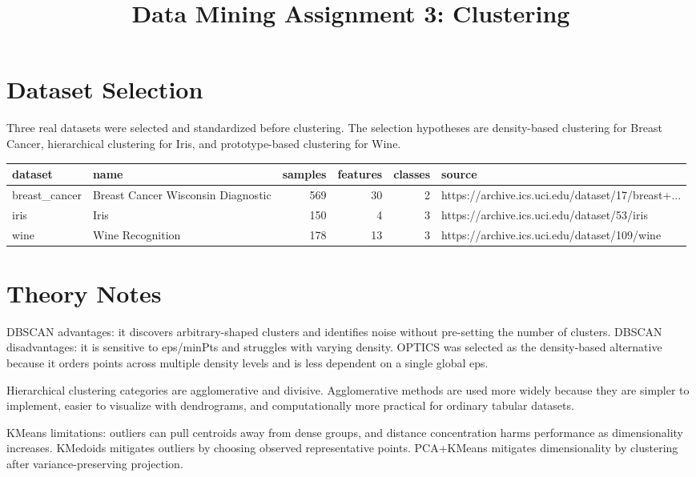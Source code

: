 \documentclass[11pt]{article}
\begin{document}
\title{Data Mining Assignment 3: Clustering}
\author{}
\date{}
\maketitle
\section*{Dataset Selection}
Three real datasets were selected and standardized before clustering. The selection hypotheses are density-based clustering for Breast Cancer, hierarchical clustering for Iris, and prototype-based clustering for Wine.
\begin{tabular}{llrrrl}
\toprule
       dataset &                                name &  samples &  features &  classes &                                             source \\
\midrule
 breast\_cancer &  Breast Cancer Wisconsin Diagnostic &      569 &        30 &        2 &  https://archive.ics.uci.edu/dataset/17/breast+... \\
          iris &                                Iris &      150 &         4 &        3 &        https://archive.ics.uci.edu/dataset/53/iris \\
          wine &                    Wine Recognition &      178 &        13 &        3 &       https://archive.ics.uci.edu/dataset/109/wine \\
\bottomrule
\end{tabular}

\section*{Theory Notes}
DBSCAN advantages: it discovers arbitrary-shaped clusters and identifies noise without pre-setting the number of clusters. DBSCAN disadvantages: it is sensitive to eps/minPts and struggles with varying density. OPTICS was selected as the density-based alternative because it orders points across multiple density levels and is less dependent on a single global eps.

Hierarchical clustering categories are agglomerative and divisive. Agglomerative methods are used more widely because they are simpler to implement, easier to visualize with dendrograms, and computationally more practical for ordinary tabular datasets.

KMeans limitations: outliers can pull centroids away from dense groups, and distance concentration harms performance as dimensionality increases. KMedoids mitigates outliers by choosing observed representative points. PCA+KMeans mitigates dimensionality by clustering after variance-preserving projection.
\end{document}
